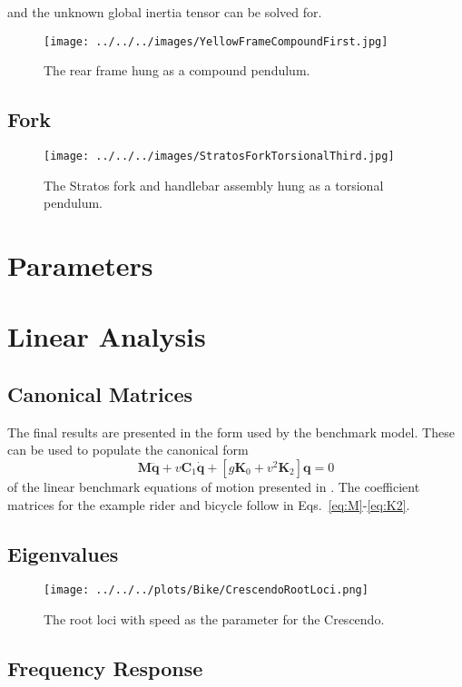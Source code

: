 \documentclass{bmd2010p}
\begin{document}
and the unknown global inertia tensor can be solved for.
\begin{figure}[htbp]
    \begin{center}
        \texttt{[image: ../../../images/YellowFrameCompoundFirst.jpg]}
    \end{center}
    \caption{The rear frame hung as a compound pendulum.}
    \label{fig:FrameCompound}
\end{figure}

\subsection{Fork}
\begin{figure}[htbp]
    \begin{center}
        \texttt{[image: ../../../images/StratosForkTorsionalThird.jpg]}
    \end{center}
    \caption{The Stratos fork and handlebar assembly hung as a torsional
    pendulum.}
    \label{fig:StratosFork}
\end{figure}
\section{Parameters}
\section{Linear Analysis}
\subsection{Canonical Matrices}
The final results are presented in the form used by the benchmark model. These
can be used to populate the canonical form
\begin{equation}
\mathbf{M\ddot{q}}+v\mathbf{C}_1\mathbf{\dot{q}}+\left[g\mathbf{K}_0+v^2\mathbf{K}_2\right]\mathbf{q}=0
\label{eq:canonical}
\end{equation}
of the linear benchmark equations of motion presented in
\cite{Meijaard2007}. The coefficient matrices for the
example rider and bicycle follow in Eqs.~\ref{eq:M}-\ref{eq:K2}.
\subsection{Eigenvalues}
\begin{figure}[htbp]
    \begin{center}
        \texttt{[image: ../../../plots/Bike/CrescendoRootLoci.png]}
    \end{center}
    \caption{The root loci with speed as the parameter for the Crescendo.}
    \label{fig:StratosFork}
\end{figure}

\subsection{Frequency Response}


\end{document}
